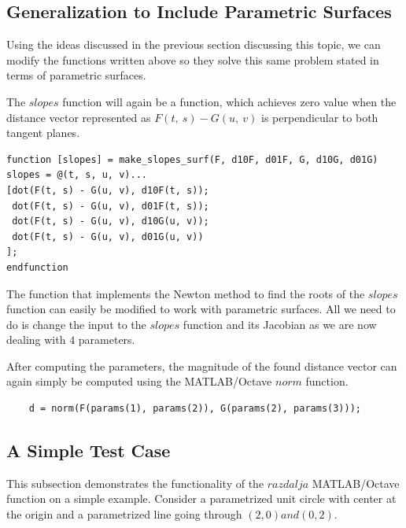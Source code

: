 \documentclass[A4]{article}
\begin{document}
\subsection{Generalization to Include Parametric Surfaces}

Using the ideas discussed in the previous section discussing this topic, we can modify the functions written above so they solve this same problem stated in terms of parametric surfaces.

The $slopes$ function will again be a function, which achieves zero value when the distance vector represented as $F(t, \ s) - G(u, \ v)$ is perpendicular to both tangent planes.

\begin{tcolorbox}
	\begin{small}
	\begin{verbatim}
function [slopes] = make_slopes_surf(F, d10F, d01F, G, d10G, d01G)
slopes = @(t, s, u, v)... 
[dot(F(t, s) - G(u, v), d10F(t, s));
 dot(F(t, s) - G(u, v), d01F(t, s));
 dot(F(t, s) - G(u, v), d10G(u, v));
 dot(F(t, s) - G(u, v), d01G(u, v))
];
endfunction
	\end{verbatim}
	\end{small}
\end{tcolorbox}

The function that implements the Newton method to find the roots of the $slopes$ function can easily be modified to work with parametric surfaces. All we need to do is change the input to the $slopes$ function and its Jacobian as we are now dealing with $4$ parameters.

After computing the parameters, the magnitude of the found distance vector can again simply be computed using the MATLAB/Octave $norm$ function.

\begin{tcolorbox}
	\begin{small}
	\begin{verbatim}
	d = norm(F(params(1), params(2)), G(params(2), params(3)));
	\end{verbatim}
	\end{small}
\end{tcolorbox}

\subsection{A Simple Test Case}

This subsection demonstrates the functionality of the $razdalja$ MATLAB/Octave function on a simple example. Consider a parametrized unit circle with center at the origin and a parametrized line going through $(2, 0) and (0, 2)$.
\vspace{5mm}
\end{document}
